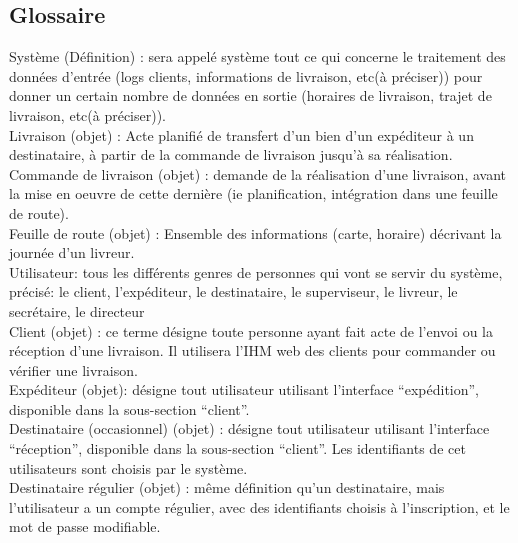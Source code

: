\documentclass{report}
\begin{document}
\begin{appendices}


\chapter{Glossaire}


Système (Définition) : sera appelé système tout ce qui concerne le traitement des données d’entrée (logs clients, informations de livraison, etc(à préciser)) pour donner un certain nombre de données en sortie (horaires de livraison, trajet de livraison, etc(à préciser)).\\

Livraison (objet) : Acte planifié de transfert d’un bien d’un expéditeur à un destinataire, à partir de la commande de livraison  jusqu’à sa réalisation.\\

Commande de livraison (objet) : demande de la réalisation d’une livraison, avant la mise en oeuvre de cette dernière (ie planification, intégration dans une feuille de route).\\

Feuille de route (objet) : Ensemble des informations (carte, horaire) décrivant la journée d’un livreur. \\

Utilisateur: tous les différents genres de personnes qui vont se servir du système, précisé: le client, l’expéditeur, le destinataire, le superviseur, le livreur, le secrétaire, le directeur\\

Client (objet) :  ce terme désigne toute personne ayant fait acte de l’envoi ou la réception d’une livraison. Il utilisera l’IHM web des clients pour commander ou vérifier une livraison. \\

Expéditeur (objet): désigne tout utilisateur utilisant l’interface “expédition”, disponible dans la sous-section “client”.\\

Destinataire (occasionnel) (objet) : désigne tout utilisateur utilisant l’interface “réception”, disponible dans la sous-section “client”. Les identifiants de cet utilisateurs sont choisis par le système.\\

Destinataire régulier (objet) : même définition qu’un destinataire, mais l’utilisateur a un compte régulier, avec des identifiants choisis à l’inscription, et le mot de passe modifiable.\\


\end{appendices}
\end{document}
